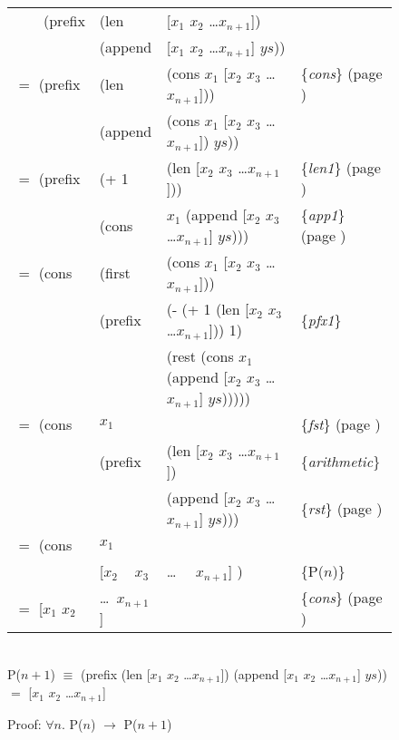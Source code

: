\begin{figure}
\begin{center}
\addtolength{\tabcolsep}{-5pt}
\begin{tabular}{llll}
~~~~(prefix &(len    &[$x_1$ $x_2$ \dots $x_{n+1}$])             &\\
            &(append &[$x_1$ $x_2$ \dots $x_{n+1}$] $ys$))       &\\
$=$ (prefix &(len    &(cons $x_1$ [$x_2$ $x_3$ \dots $x_{n+1}$]))&\{\emph{cons}\} (page \pageref{first-rest-cons})\\
            &(append &(cons $x_1$ [$x_2$ $x_3$ \dots $x_{n+1}$]) $ys$))&\\
$=$	(prefix &(+ 1    &(len [$x_2$ $x_3$ \dots $x_{n+1}$]))       &\{\emph{len1}\} (page \pageref{len-equations})\\
            &(cons   &$x_1$ (append [$x_2$ $x_3$ \dots $x_{n+1}$] $ys$)))&\{\emph{app1}\} (page \pageref{append-equations})\\
$=$ (cons   &(first  &(cons $x_1$ [$x_2$ $x_3$ \dots $x_{n+1}$]))&\\
            &(prefix &(- (+ 1 (len [$x_2$ $x_3$ \dots $x_{n+1}$])) 1)&\{\emph{pfx1}\}\\
            &        &(rest (cons $x_1$ (append [$x_2$ $x_3$ \dots $x_{n+1}$] $ys$)))))&\\
$=$ (cons   &$x_1$   &                                           &\{\emph{fst}\} (page \pageref{first-rest-cons})\\
            &(prefix &(len [$x_2$ $x_3$ \dots $x_{n+1}$])        &\{\emph{arithmetic}\}\\
            &        &(append [$x_2$ $x_3$ \dots $x_{n+1}$] $ys$)))& \{\emph{rst}\} (page \pageref{first-rest-cons})\\
$=$ (cons   &$x_1$   &                                           &\\
            &[$x_2$ ~ $x_3$ &\dots ~~ $x_{n+1}$] )               &\{P($n$)\} \\
$=$ [$x_1$ $x_2$ & \dots~$x_{n+1}$]                             &&\{\emph{cons}\} (page \pageref{first-rest-cons}) \\
\end{tabular}
\addtolength{\tabcolsep}{5pt}
~~\\
\vspace{2mm}
P($n+1$) $\equiv$ (prefix (len [$x_1$ $x_2$ \dots $x_{n+1}$]) (append [$x_1$ $x_2$ \dots $x_{n+1}$] $ys$)) $=$ [$x_1$ $x_2$ \dots $x_{n+1}$]
\end{center}
\caption{Proof: $\forall n.$ P($n$) $\rightarrow$ P($n+1$)}
\label{pfx-induc}
\end{figure}

